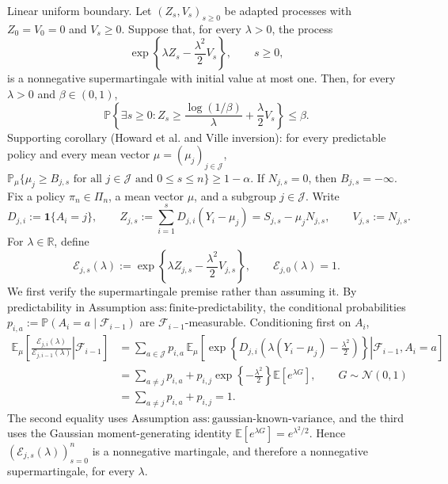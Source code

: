 Linear uniform boundary.  Let \((Z_s,V_s)_{s\geq 0}\) be adapted processes with \(Z_0=V_0=0\) and \(V_s\geq 0\).  Suppose that, for every \(\lambda>0\), the process
\[
\exp\!\left\{\lambda Z_s-\frac{\lambda^2}{2}V_s\right\},\qquad s\geq 0,
\]
is a nonnegative supermartingale with initial value at most one.  Then, for every \(\lambda>0\) and \(\beta\in(0,1)\),
\[
\mathbb P\!\left\{\exists s\geq 0:
Z_s\geq \frac{\log(1/\beta)}{\lambda}+\frac{\lambda}{2}V_s\right\}\leq\beta.
\]
Supporting corollary (Howard et al. and Ville inversion): for every predictable policy and every mean vector \(\mu=(\mu_j)_{j\in\mathcal J}\), \(\mathbb P_\mu\{\mu_j\geq B_{j,s}\text{ for all }j\in\mathcal J\text{ and }0\leq s\leq n\}\geq1-\alpha\). If \(N_{j,s}=0\), then \(B_{j,s}=-\infty\).
Fix a policy \(\pi_n\in\Pi_n\), a mean vector \(\mu\), and a subgroup \(j\in\mathcal J\).  Write
\[
D_{j,i}:=\mathbf 1\{A_i=j\},\qquad
Z_{j,s}:=\sum_{i=1}^s D_{j,i}(Y_i-\mu_j)
=S_{j,s}-\mu_jN_{j,s},\qquad
V_{j,s}:=N_{j,s}.
\]
For \(\lambda\in\mathbb R\), define
\[
\mathcal E_{j,s}(\lambda)
:=\exp\!\left\{\lambda Z_{j,s}-\frac{\lambda^2}{2}V_{j,s}\right\},
\qquad \mathcal E_{j,0}(\lambda)=1.
\]
We first verify the supermartingale premise rather than assuming it.  By predictability in Assumption \(\mathrm{ass{:}finite\mbox{-}predictability}\), the conditional probabilities
\(p_{i,a}:=\mathbb P(A_i=a\mid\mathcal F_{i-1})\) are \(\mathcal F_{i-1}\)-measurable.  Conditioning first on \(A_i\),
\[
\begin{aligned}
\mathbb E_\mu\!\left[
\left.\frac{\mathcal E_{j,i}(\lambda)}{\mathcal E_{j,i-1}(\lambda)}
\right|\mathcal F_{i-1}\right]
&=\sum_{a\in\mathcal J}p_{i,a}\,
\mathbb E_\mu\!\left[
\left.\exp\!\left\{D_{j,i}\left(\lambda(Y_i-\mu_j)-\frac{\lambda^2}{2}\right)\right\}
\right|\mathcal F_{i-1},A_i=a\right]\\
&=\sum_{a\neq j}p_{i,a}
+p_{i,j}\exp\!\left\{-\frac{\lambda^2}{2}\right\}
\mathbb E\!\left[e^{\lambda G}\right],
\qquad G\sim\mathcal N(0,1)\\
&=\sum_{a\neq j}p_{i,a}+p_{i,j}=1.
\end{aligned}
\]
The second equality uses Assumption \(\mathrm{ass{:}gaussian\mbox{-}known\mbox{-}variance}\), and the third uses the Gaussian moment-generating identity
\(\mathbb E[e^{\lambda G}]=e^{\lambda^2/2}\).  Hence \((\mathcal E_{j,s}(\lambda))_{s=0}^n\) is a nonnegative martingale, and therefore a nonnegative supermartingale, for every \(\lambda\).

